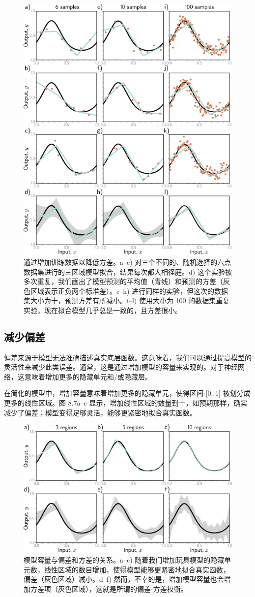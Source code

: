 \begin{figure}[ht!]
\centering
\includegraphics[width=0.7\linewidth]{png/chapter8/PerfVariance.png}
\caption{通过增加训练数据以降低方差。a–c) 对三个不同的、随机选择的六点数据集进行的三区域模型拟合，结果每次都大相径庭。d) 这个实验被多次重复，我们画出了模型预测的平均值（青线）和预测的方差（灰色区域表示正负两个标准差）。e–h) 进行同样的实验，但这次的数据集大小为十，预测方差有所减小。i–l) 使用大小为 100 的数据集重复实验，现在拟合模型几乎总是一致的，且方差很小。}
\end{figure}


\subsection{减少偏差}
偏差来源于模型无法准确描述真实底层函数。这意味着，我们可以通过提高模型的灵活性来减少此类误差。通常，这是通过增加模型的容量来实现的。对于神经网络，这意味着增加更多的隐藏单元和/或隐藏层。

在简化的模型中，增加容量意味着增加更多的隐藏单元，使得区间 [0, 1] 被划分成更多的线性区域。图 8.7a–c 显示，增加线性区域的数量到十，如预期那样，确实减少了偏差；模型变得足够灵活，能够更紧密地拟合真实函数。

\begin{figure}[ht!]
\centering
\includegraphics[width=0.7\linewidth]{png/chapter8/PerfBias.png}
\caption{模型容量与偏差和方差的关系。a–c) 随着我们增加玩具模型的隐藏单元数，线性区域的数目增加，使得模型能够更紧密地拟合真实函数，偏差（灰色区域）减小。d–f) 然而，不幸的是，增加模型容量也会增加方差项（灰色区域），这就是所谓的偏差-方差权衡。}
\end{figure}

